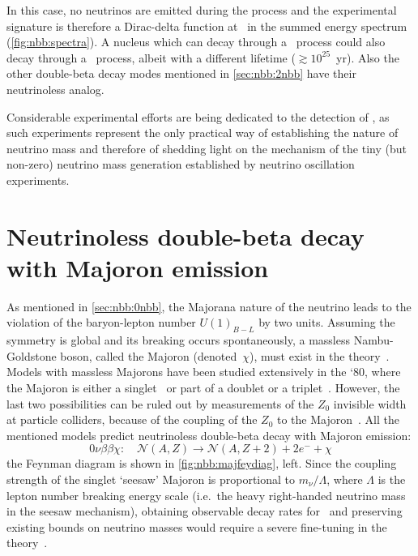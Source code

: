 In this case, no neutrinos are emitted during
the process and the experimental signature is therefore a Dirac-delta function at \qbb\
in the summed energy spectrum (\cref{fig:nbb:spectra}).  A nucleus which can
decay through a \nnbb\ process could also decay through a \onbb\ process, albeit
with a different lifetime ($\gtrsim 10^{25}$~yr). Also the other double-beta
decay modes mentioned in \cref{sec:nbb:2nbb} have their neutrinoless analog.

Considerable experimental efforts are being dedicated to the detection of
\onbb, as such experiments represent the only practical way of establishing
the nature of neutrino mass and therefore of shedding light on the mechanism of
the tiny (but non-zero) neutrino mass generation established by neutrino
oscillation experiments.

\section{Neutrinoless double-beta decay with Majoron emission}

As mentioned in \cref{sec:nbb:0nbb}, the Majorana nature of the neutrino leads
to the violation of the baryon-lepton number $U(1)_{B-L}$ by two units.
Assuming the symmetry is global and its breaking occurs spontaneously, a
massless Nambu-Goldstone boson, called the Majoron (denoted~$\chi$), must exist
in the theory~\cite{Chikashige1981, Schechter1982, Gelmini1981, Georgi1981,
Mohpatra2004}.  Models with massless Majorons have been studied extensively in
the `80, where the Majoron is either a singlet~\cite{Chikashige1981} or part of
a doublet or a triplet~\cite{Gelmini1981, Georgi1981}. However, the last two
possibilities can be ruled out by measurements of the $Z_0$ invisible width at
particle colliders, because of the coupling of the $Z_0$ to the
Majoron~\cite{Berezhiani1992}. All the mentioned models predict neutrinoless
double-beta decay with Majoron emission:
\[
  0\nu\beta\beta\chi:\quad
    \mathcal{N}(A,Z) \longrightarrow \mathcal{N}(A,Z+2) + 2e^- + \chi
\]
the Feynman diagram is shown in \cref{fig:nbb:majfeydiag}, left. Since the
coupling strength of the singlet `seesaw' Majoron is proportional to $m_\nu /
\Lambda$, where $\Lambda$ is the lepton number breaking energy scale (i.e.~the
heavy right-handed neutrino mass in the seesaw mechanism), obtaining observable
decay rates for \onbbx\ and preserving existing bounds on neutrino masses would
require a severe fine-tuning in the theory~\cite{Burgess1993, Burgess1994}.


